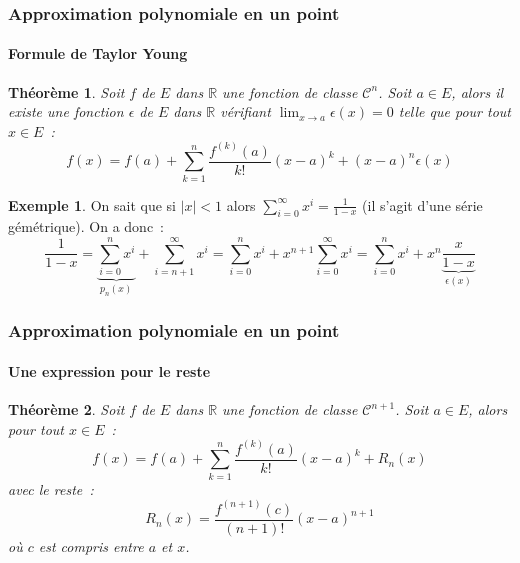 \documentclass[10pt,notheorems]{beamer}
\theoremstyle{plain}
\newtheorem{theorem}{Théorème}
\theoremstyle{definition} %
\newtheorem{example}{Exemple}
\begin{document}
\begin{frame}
  \frametitle{Approximation polynomiale en un point}
  \framesubtitle{Formule de Taylor Young}
  \hypertarget{slide_taylor_8}{}

  \bigskip

  \begin{theorem}
    Soit $f$ de $E$ dans $\mathbb R$ une fonction de classe $\mathcal C^n$. Soit $a\in E$, alors il existe une fonction $\epsilon$ de $E$ dans $\mathbb R$ vérifiant $\lim_{x\rightarrow a}\epsilon(x) = 0$ telle que pour tout $x\in E$~:
    \[
      f(x) = f(a) + \sum_{k=1}^n\frac{f^{(k)}(a)}{k!}(x-a)^k + (x-a)^n\epsilon(x)
    \]
  \end{theorem}

  \begin{example}
    On sait que si $|x|<1$ alors $\sum_{i=0}^\infty x^i = \frac{1}{1-x}$ (il s'agit d'une série gémétrique). On a donc~:
    {\small
      \[
        \frac{1}{1-x} = \underbrace{\sum_{i=0}^nx^i}_{p_n(x)} + \sum_{i=n+1}^\infty x^i
        = \sum_{i=0}^nx^i + x^{n+1}\sum_{i=0}^\infty x^i
        = \sum_{i=0}^nx^i + x^{n}\underbrace{\frac{x}{1-x}}_{\epsilon(x)}
      \]}
  \end{example}

\end{frame}


\begin{frame}
  \frametitle{Approximation polynomiale en un point}
  \framesubtitle{Une expression pour le reste}
  \hypertarget{slide_taylor_9}{}
  \bigskip

  \begin{theorem}\label{thm:taylor}
    Soit $f$ de $E$ dans $\mathbb R$ une fonction de classe $\mathcal C^{n+1}$. Soit $a\in E$, alors pour tout $x\in E$~:
    \[
      f(x) = f(a) + \sum_{k=1}^n\frac{f^{(k)}(a)}{k!}(x-a)^k + R_n(x)
    \]
    avec le reste~:
    \[
      R_n(x) = \frac{f^{(n+1)}(c)}{(n+1)!}(x-a)^{n+1}
    \]
    où $c$ est compris entre $a$ et $x$.
  \end{theorem}

\end{frame}
\end{document}
